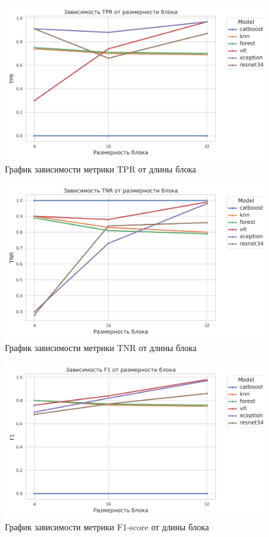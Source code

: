 \documentclass[spec, och, diploma]{SCWorks}
\begin{document}
    \begin{figure}[H]
        \centering
        \includegraphics[width=1\textwidth]{pic/tpr.png}
        \caption{График зависимости метрики TPR от длины блока}
    \end{figure}

    \begin{figure}[H]
        \centering
        \includegraphics[width=1\textwidth]{pic/tnr.png}
        \caption{График зависимости метрики TNR от длины блока}
    \end{figure}

    \begin{figure}[H]
        \centering
        \includegraphics[width=1\textwidth]{pic/f1score.png}
        \caption{График зависимости метрики F1-score от длины блока}
    \end{figure}
\end{document}
